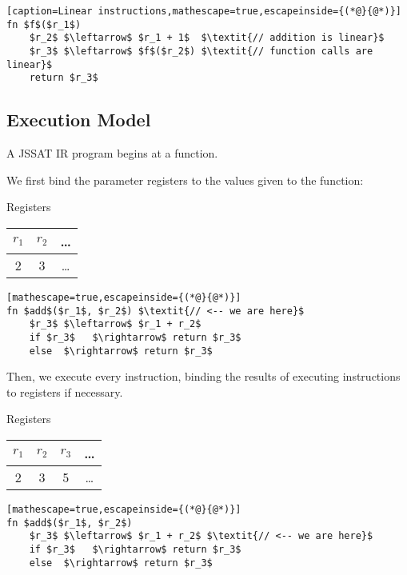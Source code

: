 \documentclass[twocolumn]{article}
\begin{document}
\begin{lstlisting}[caption=Linear instructions,mathescape=true,escapeinside={(*@}{@*)}]
fn $f$($r_1$)
    $r_2$ $\leftarrow$ $r_1 + 1$  $\textit{// addition is linear}$
    $r_3$ $\leftarrow$ $f$($r_2$) $\textit{// function calls are linear}$
    return $r_3$
\end{lstlisting}

\subsection{Execution Model}

A JSSAT IR program begins at a function.

We first bind the parameter registers to the values given to the function:

\begin{center}
  Registers \\
  \begin{tabular}{ |c|c|c| }
    \hline
    $r_1$ & $r_2$ & \dots \\
    \hline
    2     & 3     & \dots \\
    \hline
  \end{tabular}
\end{center}

\begin{lstlisting}[mathescape=true,escapeinside={(*@}{@*)}]
fn $add$($r_1$, $r_2$) $\textit{// <-- we are here}$
    $r_3$ $\leftarrow$ $r_1 + r_2$
    if $r_3$   $\rightarrow$ return $r_3$
    else  $\rightarrow$ return $r_3$
\end{lstlisting}

Then, we execute every instruction, binding the results of executing instructions
to registers if necessary.

\begin{center}
  Registers \\
  \begin{tabular}{ |c|c|c|c| }
    \hline
    $r_1$ & $r_2$ & $r_3$ & \dots \\
    \hline
    2     & 3     & 5     & \dots \\
    \hline
  \end{tabular}
\end{center}

\begin{lstlisting}[mathescape=true,escapeinside={(*@}{@*)}]
fn $add$($r_1$, $r_2$)
    $r_3$ $\leftarrow$ $r_1 + r_2$ $\textit{// <-- we are here}$
    if $r_3$   $\rightarrow$ return $r_3$
    else  $\rightarrow$ return $r_3$
\end{lstlisting}
\end{document}
